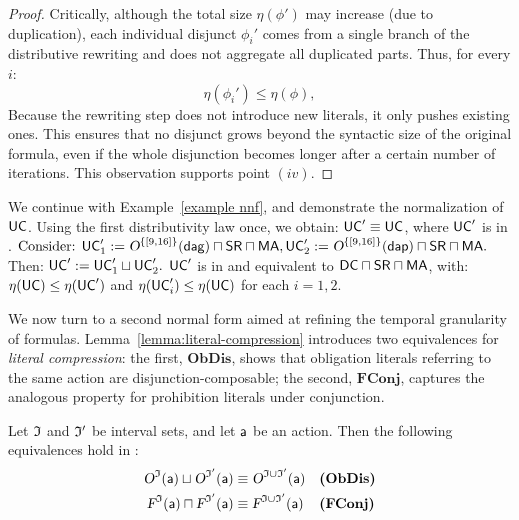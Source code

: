 \begin{proof}
Critically, although the total size $\eta(\phi')$ may increase (due to duplication), each individual disjunct $\phi_i'$ comes from a single branch of the distributive rewriting and does not aggregate all duplicated parts. Thus, for every $i$:
\[
\eta(\phi_i') \leq \eta(\phi),
\]
Because the rewriting step does not introduce new literals, it only pushes existing ones. This ensures that no disjunct grows beyond the syntactic size of the original formula, even if the whole disjunction becomes longer after a certain number of iterations. This observation supports point $(iv)$.

\end{proof}

\begin{example}
We continue with Example~\ref{example nnf}, and demonstrate the normalization of $\mathsf{UC}$. Using the first distributivity law once, we obtain:
$\mathsf{UC}' \equiv  \mathsf{UC}$,
where $\mathsf{UC}'$ is in \dnf.
$\text{Consider: } 
\mathsf{UC}_1' := \textsl{O}^{\{[9,16]\}}(\mathsf{\mathsf{dag}}) \sqcap \mathsf{SR} \sqcap \mathsf{MA}, 
\\\mathsf{UC}_2' := \textsl{O}^{\{[9,16]\}}(\mathsf{\mathsf{dap}}) \sqcap \mathsf{SR} \sqcap \mathsf{MA}.$
Then:
$\mathsf{UC}' := \mathsf{UC}_1' \sqcup \mathsf{UC}_2'.$
$\mathsf{UC}'$ is in \dnf and equivalent to $\mathsf{DC} \sqcap \mathsf{SR} \sqcap \mathsf{MA}$, with:
$\eta(\mathsf{UC}) \leq \eta(\mathsf{UC}')$ and $\eta(\mathsf{UC}_i') \leq \eta(\mathsf{UC})$ for each $i = 1, 2$.
\end{example}


We now turn to a second normal form aimed at refining the temporal granularity of formulas. Lemma~\ref{lemma:literal-compression} introduces two equivalences for \emph{literal compression}: the first, $\textbf{ObDis}$, shows that obligation literals referring to the same action are disjunction-composable; the second, $\textbf{FConj}$, captures the analogous property for prohibition literals under conjunction.

\begin{lemma}  
\label{lemma:literal-compression}  
Let $\mathfrak{I}$ and $\mathfrak{I}'$ be interval sets, and let $\mathsf{a} $ be an action. Then the following equivalences hold in \TDDLfm:
\begin{align*}
\textsl{O}^{\mathfrak{I}}(\mathsf{a}) \sqcup \textsl{O}^{\mathfrak{I}'}(\mathsf{a}) &\equiv  \textsl{O}^{\mathfrak{I} \cup \mathfrak{I}'}(\mathsf{a}) && \text{\textbf{(ObDis)}} \\
\textsl{F}^{\mathfrak{I}}(\mathsf{a}) \sqcap \textsl{F}^{\mathfrak{I}'}(\mathsf{a}) &\equiv  \textsl{F}^{\mathfrak{I} \cup \mathfrak{I}'}(\mathsf{a}) && \text{\textbf{(FConj)}}
\end{align*}
\end{lemma}

